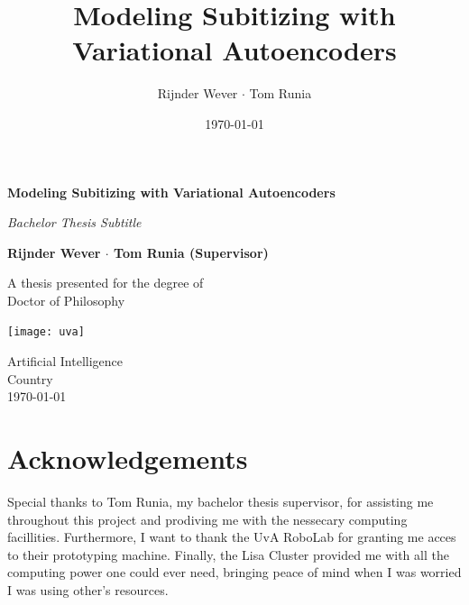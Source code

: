 \documentclass[twocolumn]{article}
\title{Modeling Subitizing with Variational Autoencoders}
\author{Rijnder Wever \(\cdot\) Tom Runia}
\affil{University of Amsterdam} %
\date{\today}
\begin{document}
\begin{titlepage}
    \begin{center}
        \vspace*{\fill} %
        \Huge
        \textbf{Modeling Subitizing with Variational Autoencoders}
        
        \vspace{0.5cm}
        \textit{Bachelor Thesis Subtitle}
        
        \vspace{1.5cm}
        \Large
        \textbf{Rijnder Wever \(\cdot\) Tom Runia (Supervisor)}\\
        
        \vfill
        
        A thesis presented for the degree of\\
        Doctor of Philosophy
        
        \vspace{0.8cm}
        
        \texttt{[image: uva]}
        
        Artificial Intelligence\\
        Country\\
        \today
        
    \end{center}
\end{titlepage}

\onecolumn %
{
  \hypersetup{linkcolor=black}
  \vspace*{\fill} %
  \tableofcontents
  \section*{Acknowledgements}

  Special thanks to Tom Runia, my bachelor thesis supervisor, for assisting me throughout this project and prodiving me with the nessecary computing facillities. Furthermore, I want to thank the UvA RoboLab for granting me acces to their prototyping machine. Finally, the Lisa Cluster provided me with all the computing power one could ever need, bringing peace of mind when I was worried I was using other's resources. 

  \vspace*{\fill}
}
\newpage
\twocolumn

\maketitle
\end{document}
